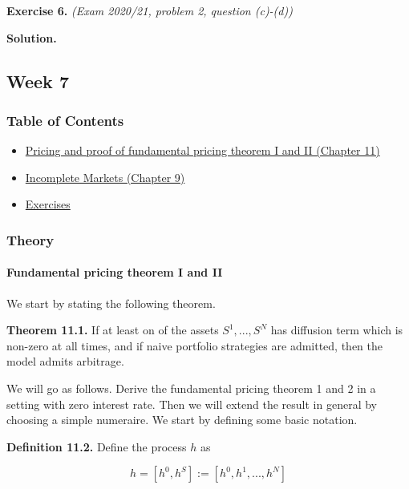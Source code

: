\documentclass[
]{article}
\begin{document}
\textbf{Exercise 6.} \emph{(Exam 2020/21, problem 2, question (c)-(d))}

\textbf{Solution.}

\hypertarget{week-7}{%
\subsection{Week 7}\label{week-7}}

\hypertarget{table-of-contents-6}{%
\subsubsection{Table of Contents}\label{table-of-contents-6}}

\begin{itemize}
\item
  \protect\hyperlink{fundamental-pricing-theorem-i-and-ii}{Pricing and
  proof of fundamental pricing theorem I and II (Chapter 11)}
\item
  \protect\hyperlink{incomplete-markets}{Incomplete Markets (Chapter 9)}
\item
  \protect\hyperlink{exercises-week-7}{Exercises}
\end{itemize}

\hypertarget{theory-6}{%
\subsubsection{Theory}\label{theory-6}}

\hypertarget{fundamental-pricing-theorem-i-and-ii}{%
\paragraph{Fundamental pricing theorem I and
II}\label{fundamental-pricing-theorem-i-and-ii}}

We start by stating the following theorem.

\textbf{Theorem 11.1.} If at least on of the assets \(S^1,...,S^N\) has
diffusion term which is non-zero at all times, and if naive portfolio
strategies are admitted, then the model admits arbitrage.

We will go as follows. Derive the fundamental pricing theorem 1 and 2 in
a setting with zero interest rate. Then we will extend the result in
general by choosing a simple numeraire. We start by defining some basic
notation.

\textbf{Definition 11.2.} Define the process \(h\) as

\[
h=[h^0,h^S]:=[h^0,h^1,...,h^N]
\]
\end{document}
